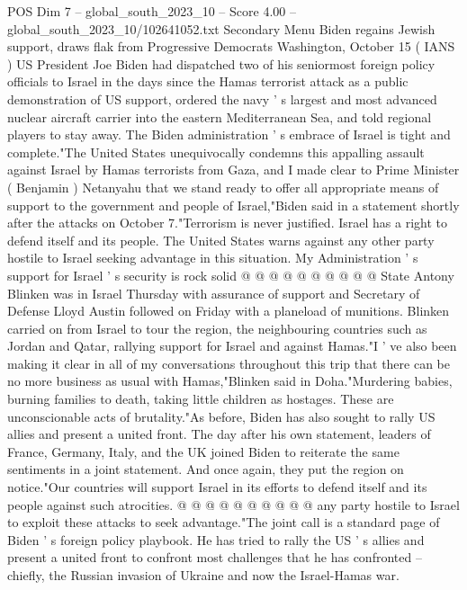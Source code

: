 \begin{textsample}{POS Dim 7 – global\_south\_2023\_10 – Score 4.00 – global\_south\_2023\_10/102641052.txt}  \label{ex:f7_pos_395}
Secondary Menu Biden regains Jewish support, draws flak from Progressive Democrats Washington, October 15 ( IANS ) US President Joe Biden had dispatched two of his seniormost foreign policy officials to Israel in the days since the Hamas terrorist attack as a public demonstration of US support, ordered the navy ' s largest and most advanced nuclear aircraft carrier into the eastern Mediterranean Sea, and told regional players to stay away.
The Biden administration ' s embrace of Israel is tight and complete."The United States unequivocally condemns this appalling assault against Israel by Hamas terrorists from Gaza, and I made clear to Prime Minister ( Benjamin ) Netanyahu that we stand ready to offer all appropriate means of support to the government and people of Israel,"Biden said in a statement shortly after the attacks on October 7."Terrorism is never justified.
Israel has a right to defend itself and its people.
The United States warns against any other party hostile to Israel seeking advantage in this situation.
My Administration ' s support for Israel ' s security is rock solid @ @ @ @ @ @ @ @ @ @ State Antony Blinken was in Israel Thursday with assurance of support and Secretary of Defense Lloyd Austin followed on Friday with a planeload of munitions.
Blinken carried on from Israel to tour the region, the neighbouring countries such as Jordan and Qatar, rallying support for Israel and against Hamas."I ' ve also been making it clear in all of my conversations throughout this trip that there can be no more business as usual with Hamas,"Blinken said in Doha."Murdering babies, burning families to death, taking little children as hostages.
These are unconscionable acts of brutality."As before, Biden has also sought to rally US allies and present a united front.
The day after his own statement, leaders of France, Germany, Italy, and the UK joined Biden to reiterate the same sentiments in a joint statement.
And once again, they put the region on notice."Our countries will support Israel in its efforts to defend itself and its people against such atrocities. @ @ @ @ @ @ @ @ @ @ any party hostile to Israel to exploit these attacks to seek advantage."The joint call is a standard page of Biden ' s foreign policy playbook.
He has tried to rally the US ' s allies and present a united front to confront most challenges that he has confronted -- chiefly, the Russian invasion of Ukraine and now the Israel-Hamas war.

\end{textsample}

